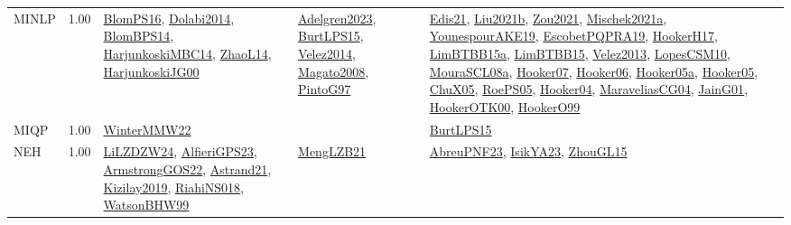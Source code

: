 {\begin{longtable}{p{3cm}r>{\raggedright\arraybackslash}p{6cm}>{\raggedright\arraybackslash}p{6cm}>{\raggedright\arraybackslash}p{8cm}}
\index{MINLP}\index{Algorithms!MINLP}MINLP &  1.00 & \hyperref[detail:BlomPS16]{BlomPS16}, \hyperref[detail:Dolabi2014]{Dolabi2014}, \hyperref[detail:BlomBPS14]{BlomBPS14}, \hyperref[detail:HarjunkoskiMBC14]{HarjunkoskiMBC14}, \hyperref[detail:ZhaoL14]{ZhaoL14}, \hyperref[detail:HarjunkoskiJG00]{HarjunkoskiJG00} & \hyperref[detail:Adelgren2023]{Adelgren2023}, \hyperref[detail:BurtLPS15]{BurtLPS15}, \hyperref[detail:Velez2014]{Velez2014}, \hyperref[detail:Magato2008]{Magato2008}, \hyperref[detail:PintoG97]{PintoG97} & \hyperref[detail:Edis21]{Edis21}, \hyperref[detail:Liu2021b]{Liu2021b}, \hyperref[detail:Zou2021]{Zou2021}, \hyperref[detail:Mischek2021a]{Mischek2021a}, \hyperref[detail:YounespourAKE19]{YounespourAKE19}, \hyperref[detail:EscobetPQPRA19]{EscobetPQPRA19}, \hyperref[detail:HookerH17]{HookerH17}, \hyperref[detail:LimBTBB15a]{LimBTBB15a}, \hyperref[detail:LimBTBB15]{LimBTBB15}, \hyperref[detail:Velez2013]{Velez2013}, \hyperref[detail:LopesCSM10]{LopesCSM10}, \hyperref[detail:MouraSCL08a]{MouraSCL08a}, \hyperref[detail:Hooker07]{Hooker07}, \hyperref[detail:Hooker06]{Hooker06}, \hyperref[detail:Hooker05a]{Hooker05a}, \hyperref[detail:Hooker05]{Hooker05}, \hyperref[detail:ChuX05]{ChuX05}, \hyperref[detail:RoePS05]{RoePS05}, \hyperref[detail:Hooker04]{Hooker04}, \hyperref[detail:MaraveliasCG04]{MaraveliasCG04}, \hyperref[detail:JainG01]{JainG01}, \hyperref[detail:HookerOTK00]{HookerOTK00}, \hyperref[detail:HookerO99]{HookerO99}\\
\index{MIQP}\index{Algorithms!MIQP}MIQP &  1.00 & \hyperref[detail:WinterMMW22]{WinterMMW22} &  & \hyperref[detail:BurtLPS15]{BurtLPS15}\\
\index{NEH}\index{Algorithms!NEH}NEH &  1.00 & \hyperref[detail:LiLZDZW24]{LiLZDZW24}, \hyperref[detail:AlfieriGPS23]{AlfieriGPS23}, \hyperref[detail:ArmstrongGOS22]{ArmstrongGOS22}, \hyperref[detail:Astrand21]{Astrand21}, \hyperref[detail:Kizilay2019]{Kizilay2019}, \hyperref[detail:RiahiNS018]{RiahiNS018}, \hyperref[detail:WatsonBHW99]{WatsonBHW99} & \hyperref[detail:MengLZB21]{MengLZB21} & \hyperref[detail:AbreuPNF23]{AbreuPNF23}, \hyperref[detail:IsikYA23]{IsikYA23}, \hyperref[detail:ZhouGL15]{ZhouGL15}\\

\end{longtable}}
